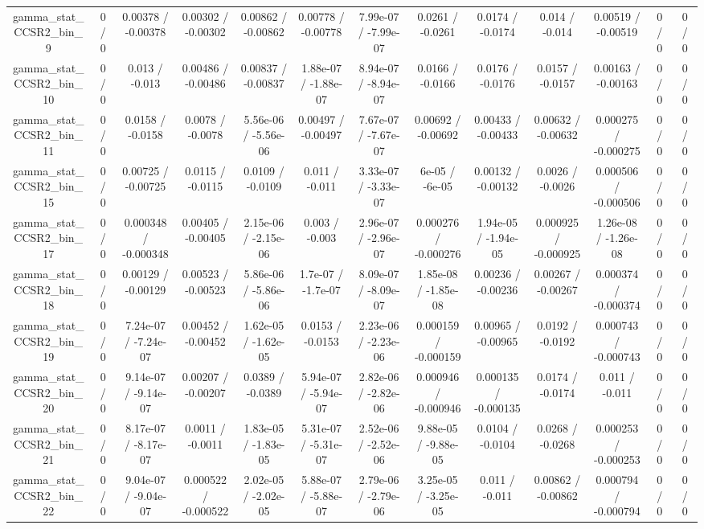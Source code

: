\documentclass[10pt]{article}
\begin{document}
\begin{table}[htbp]
\begin{center}
\begin{tabular}{|c|c|c|c|c|c|c|c|c|c|c|c|c|}
  gamma_stat_CCSR2_bin_9 & 0 / 0 & 0.00378 / -0.00378 & 0.00302 / -0.00302 & 0.00862 / -0.00862 & 0.00778 / -0.00778 & 7.99e-07 / -7.99e-07 & 0.0261 / -0.0261 & 0.0174 / -0.0174 & 0.014 / -0.014 & 0.00519 / -0.00519 & 0 / 0 & 0 / 0 \\ 
  gamma_stat_CCSR2_bin_10 & 0 / 0 & 0.013 / -0.013 & 0.00486 / -0.00486 & 0.00837 / -0.00837 & 1.88e-07 / -1.88e-07 & 8.94e-07 / -8.94e-07 & 0.0166 / -0.0166 & 0.0176 / -0.0176 & 0.0157 / -0.0157 & 0.00163 / -0.00163 & 0 / 0 & 0 / 0 \\ 
  gamma_stat_CCSR2_bin_11 & 0 / 0 & 0.0158 / -0.0158 & 0.0078 / -0.0078 & 5.56e-06 / -5.56e-06 & 0.00497 / -0.00497 & 7.67e-07 / -7.67e-07 & 0.00692 / -0.00692 & 0.00433 / -0.00433 & 0.00632 / -0.00632 & 0.000275 / -0.000275 & 0 / 0 & 0 / 0 \\ 
  gamma_stat_CCSR2_bin_15 & 0 / 0 & 0.00725 / -0.00725 & 0.0115 / -0.0115 & 0.0109 / -0.0109 & 0.011 / -0.011 & 3.33e-07 / -3.33e-07 & 6e-05 / -6e-05 & 0.00132 / -0.00132 & 0.0026 / -0.0026 & 0.000506 / -0.000506 & 0 / 0 & 0 / 0 \\ 
  gamma_stat_CCSR2_bin_17 & 0 / 0 & 0.000348 / -0.000348 & 0.00405 / -0.00405 & 2.15e-06 / -2.15e-06 & 0.003 / -0.003 & 2.96e-07 / -2.96e-07 & 0.000276 / -0.000276 & 1.94e-05 / -1.94e-05 & 0.000925 / -0.000925 & 1.26e-08 / -1.26e-08 & 0 / 0 & 0 / 0 \\ 
  gamma_stat_CCSR2_bin_18 & 0 / 0 & 0.00129 / -0.00129 & 0.00523 / -0.00523 & 5.86e-06 / -5.86e-06 & 1.7e-07 / -1.7e-07 & 8.09e-07 / -8.09e-07 & 1.85e-08 / -1.85e-08 & 0.00236 / -0.00236 & 0.00267 / -0.00267 & 0.000374 / -0.000374 & 0 / 0 & 0 / 0 \\ 
  gamma_stat_CCSR2_bin_19 & 0 / 0 & 7.24e-07 / -7.24e-07 & 0.00452 / -0.00452 & 1.62e-05 / -1.62e-05 & 0.0153 / -0.0153 & 2.23e-06 / -2.23e-06 & 0.000159 / -0.000159 & 0.00965 / -0.00965 & 0.0192 / -0.0192 & 0.000743 / -0.000743 & 0 / 0 & 0 / 0 \\ 
  gamma_stat_CCSR2_bin_20 & 0 / 0 & 9.14e-07 / -9.14e-07 & 0.00207 / -0.00207 & 0.0389 / -0.0389 & 5.94e-07 / -5.94e-07 & 2.82e-06 / -2.82e-06 & 0.000946 / -0.000946 & 0.000135 / -0.000135 & 0.0174 / -0.0174 & 0.011 / -0.011 & 0 / 0 & 0 / 0 \\ 
  gamma_stat_CCSR2_bin_21 & 0 / 0 & 8.17e-07 / -8.17e-07 & 0.0011 / -0.0011 & 1.83e-05 / -1.83e-05 & 5.31e-07 / -5.31e-07 & 2.52e-06 / -2.52e-06 & 9.88e-05 / -9.88e-05 & 0.0104 / -0.0104 & 0.0268 / -0.0268 & 0.000253 / -0.000253 & 0 / 0 & 0 / 0 \\ 
  gamma_stat_CCSR2_bin_22 & 0 / 0 & 9.04e-07 / -9.04e-07 & 0.000522 / -0.000522 & 2.02e-05 / -2.02e-05 & 5.88e-07 / -5.88e-07 & 2.79e-06 / -2.79e-06 & 3.25e-05 / -3.25e-05 & 0.011 / -0.011 & 0.00862 / -0.00862 & 0.000794 / -0.000794 & 0 / 0 & 0 / 0 \\ 

\end{tabular}
\end{center}
\end{table}
\end{document}
